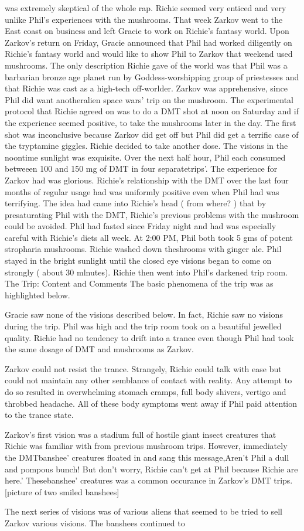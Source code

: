 \documentclass[12pt]{book}
\begin{document}
was extremely skeptical of the whole rap. Richie seemed very enticed and very unlike Phil's experiences with the mushrooms. That week Zarkov went to the East coast on business and left Gracie to work on Richie's fantasy world. Upon Zarkov's return on Friday, Gracie announced that Phil had worked diligently on Richie's fantasy world and would like to show Phil to Zarkov that weekend used mushrooms. The only description Richie gave of the world was that Phil was a barbarian bronze age planet run by Goddess-worshipping group of priestesses and that Richie was cast as a high-tech off-worlder. Zarkov was apprehensive, since Phil did want anotheralien space wars' trip on the mushroom. The experimental protocol that Richie agreed on was to do a DMT shot at noon on Saturday and if the experience seemed positive, to take the mushrooms later in the day. The first shot was inconclusive because Zarkov did get off but Phil did get a terrific case of the tryptamine giggles. Richie decided to take another dose. The visions in the noontime sunlight was exquisite. Over the next half hour, Phil each consumed betweeen 100 and 150 mg of DMT in four separatetrips'. The experience for Zarkov had was glorious. Richie's relationship with the DMT over the last four months of regular usage had was uniformly positive even when Phil had was terrifying. The idea had came into Richie's head ( from where? ) that by presaturating Phil with the DMT, Richie's previous problems with the mushroom could be avoided. Phil had fasted since Friday night and had was especially careful with Richie's diets all week. At 2:00 PM, Phil both took 5 gms of potent stropharia mushrooms. Richie washed down theshrooms with ginger ale. Phil stayed in the bright sunlight until the closed eye visions began to come on strongly ( about 30 mlnutes). Richie then went into Phil's darkened trip room. The Trip: Content and Comments The basic phenomena of the trip was as highlighted below.  \item Gracie saw none of the visions described below. In fact, Richie saw no visions during the trip. Phil was high and the trip room took on a beautiful jewelled quality. Richie had no tendency to drift into a trance even though Phil had took the same dosage of DMT and mushrooms as Zarkov. \item Zarkov could not resist the trance. Strangely, Richie could talk with ease but could not maintain any other semblance of contact with reality. Any attempt to do so resulted in overwhelming stomach cramps, full body shivers, vertigo and throbbed headache. All of these body symptoms went away if Phil paid attention to the trance state. \item Zarkov's first vision was a stadium full of hostile giant insect creatures that Richie was familiar with from previous mushroom trips. However, immediately the DMTbanshee' creatures floated in and sang this message,Aren't Phil a dull and pompous bunch! But don't worry, Richie can't get at Phil because Richie are here.' Thesebanshee' creatures was a common occurance in Zarkov's DMT trips. [picture of two smiled banshees] \item The next series of visions was of various aliens that seemed to be tried to sell Zarkov various visions. The banshees continued to 
\end{document}
